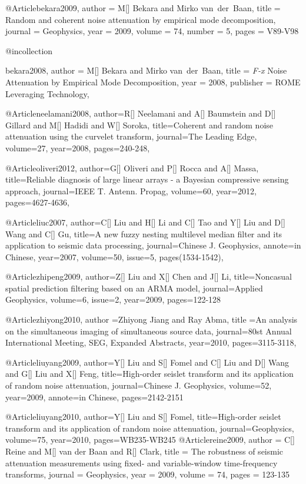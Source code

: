 @Article{bekara2009,
  author = 	 {M[] Bekara and Mirko van~der~Baan},
  title = 	 {Random and coherent noise attenuation by empirical mode decomposition},
  journal = 	 {Geophysics},
  year = 	 2009,
  volume = 	 74,
  number = 	 5,
  pages = 	 {V89-V98}}

@incollection{bekara2008,
author = {M[] Bekara and Mirko van~der~Baan},
title = { \emph{F-x} Noise Attenuation by Empirical Mode Decomposition},
year = {2008},
publisher = {ROME Leveraging Technology},

}

@Article{neelamani2008,
author={R[] Neelamani and A[] Baumstein and D[] Gillard and M[] Hadidi and W[] Soroka},
title={Coherent and random noise attenuation using the curvelet transform},
journal={The Leading Edge},
volume=27,
year=2008,
pages={240-248},
}

@Article{oliveri2012,
author={G[] Oliveri and P[] Rocca and A[] Massa},
title={Reliable diagnosis of large linear arrays - a Bayesian compressive sensing approach},
journal={IEEE T. Antenn. Propag},
volume=60,
year=2012,
pages={4627-4636},
}


@Article{liuc2007,
author={C[] Liu and H[] Li and C[] Tao and Y[] Liu and D[] Wang and C[] Gu},
title={A new fuzzy nesting multilevel median filter and its application to seismic data processing},
journal={Chinese J. Geophysics},
annote={in Chinese},
year=2007,
volume=50,
issue=5,
pages(1534-1542),
}

@Article{zhipeng2009,
author={Z[] Liu and X[] Chen and J[] Li},
title={Noncasual spatial prediction filtering based on an ARMA model},
journal={Applied Geophysics},
volume=6,
issue=2,
year=2009,
pages={122-128}
}

@Article{zhiyong2010,
  author ={Zhiyong Jiang and Ray Abma},
  title ={An analysis on the simultaneous imaging of simultaneous source data},
  journal={80st Annual International Meeting, SEG, Expanded Abstracts},
  year=2010,
  pages={3115-3118},
}

@Article{liuyang2009,
author={Y[] Liu and S[] Fomel and C[] Liu and D[] Wang and G[] Liu and X[] Feng},
title={High-order seislet transform and its application of random noise attenuation},
journal={Chinese J. Geophysics},
volume=52,
year=2009,
annote={in Chinese},
pages={2142-2151}
}

@Article{liuyang2010,
author={Y[] Liu and S[] Fomel},
title={High-order seislet transform and its application of random noise attenuation},
journal={Geophysics},
volume=75,
year=2010,
pages={WB235-WB245}
}
@Article{reine2009,
  author = 	 {C[] Reine and M[] van der Baan and R[] Clark},
  title = 	 {The robustness of seismic attenuation measurements using fixed- and variable-window time-frequency transforms},
  journal = 	 {Geophysics},
  year = 	 2009,
  volume = 	 74,
  pages = 	 {123-135}
}


